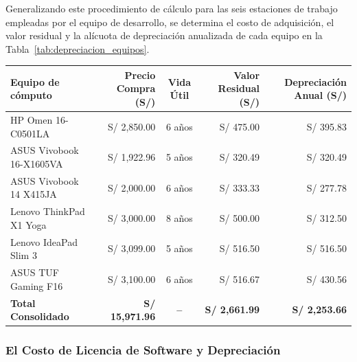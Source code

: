 Generalizando este procedimiento de cálculo para las seis estaciones de trabajo empleadas por el equipo de desarrollo, se determina el costo de adquisición, 
el valor residual y la alícuota de depreciación anualizada de cada equipo en la Tabla~\ref{tab:depreciacion_equipos}.

\par
\noindent
\begin{minipage}{\linewidth}

    \begingroup
    \renewcommand{\baselinestretch}{1}
    \footnotesize
    \setlength{\tabcolsep}{4pt}
    \renewcommand{\arraystretch}{1.25}

    \begin{tabularx}{\linewidth}{@{}p{4.4cm}r c r r@{}}
        \toprule
        \textbf{Equipo de cómputo} & \textbf{Precio Compra (S/)} & \textbf{Vida Útil} & \textbf{Valor Residual (S/)} & \textbf{Depreciación Anual (S/)} \\ \midrule
        HP Omen 16-C0501LA & S/ 2,850.00 & 6 años & S/ 475.00 & S/ 395.83 \\ 
        ASUS Vivobook 16-X1605VA & S/ 1,922.96 & 5 años & S/ 320.49 & S/ 320.49 \\ 
        ASUS Vivobook 14 X415JA & S/ 2,000.00 & 6 años & S/ 333.33 & S/ 277.78 \\ 
        Lenovo ThinkPad X1 Yoga & S/ 3,000.00 & 8 años & S/ 500.00 & S/ 312.50 \\ 
        Lenovo IdeaPad Slim 3 & S/ 3,099.00 & 5 años & S/ 516.50 & S/ 516.50 \\ 
        ASUS TUF Gaming F16 & S/ 3,100.00 & 6 años & S/ 516.67 & S/ 430.56 \\ \midrule
        \textbf{Total Consolidado} & \textbf{S/ 15,971.96} & \textbf{--} & \textbf{S/ 2,661.99} & \textbf{S/ 2,253.66} \\ \bottomrule
    \end{tabularx}
    \endgroup

\end{minipage}
\finBloqueAPA

\subsubsection{El Costo de Licencia de Software y Depreciación}

